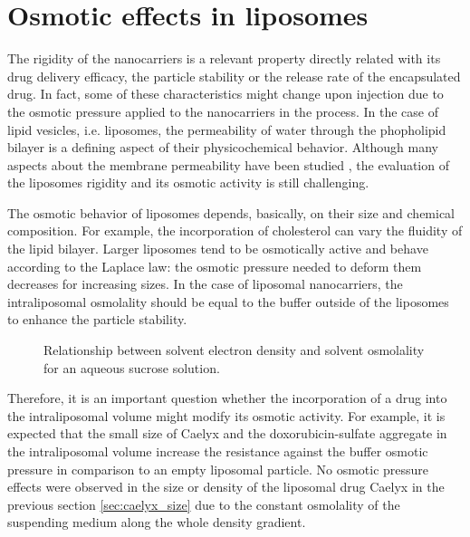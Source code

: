 \section{Osmotic effects in liposomes}

The rigidity of the nanocarriers is a relevant property directly related with its drug delivery efficacy, the particle stability or the release rate of the encapsulated drug. In fact, some of these characteristics might change upon injection due to the osmotic pressure applied to the nanocarriers in the process. In the case of lipid vesicles, i.e. liposomes, the permeability of water through the phopholipid bilayer is a defining aspect of their physicochemical behavior. Although many aspects about the membrane permeability have been studied \citep{nagle_theory_2008, mathai_structural_2008, olbrich_water_2000}, the evaluation of the liposomes rigidity and its osmotic activity is still challenging.

The osmotic behavior of liposomes depends, basically, on their size and chemical composition. For example, the incorporation of cholesterol can vary the fluidity of the lipid bilayer. Larger liposomes tend to be osmotically active \citep{de_gier_osmotic_1993} and behave according to the Laplace law: the osmotic pressure needed to deform them decreases for increasing sizes. In the case of liposomal nanocarriers, the intraliposomal osmolality should be equal to the buffer outside of the liposomes to enhance the particle stability. 

\begin{figure}
	\centering
		
		\caption[Relationship between solvent electron density and solvent osmolality for an aqueous sucrose solution.]{Relationship between solvent electron density and solvent osmolality for an aqueous sucrose solution.}
		\label{fig:OsmolalityElectronDensity}
\end{figure}

Therefore, it is an important question whether the incorporation of a drug into the intraliposomal volume might modify its osmotic activity. For example, it is expected that the small size of Caelyx and the doxorubicin-sulfate aggregate in the intraliposomal volume increase the resistance against the buffer osmotic pressure in comparison to an empty liposomal particle.  No osmotic pressure effects were observed in the size or density of the liposomal drug Caelyx in the previous section \ref{sec:caelyx_size} due to the constant osmolality of the suspending medium along the whole density gradient.

